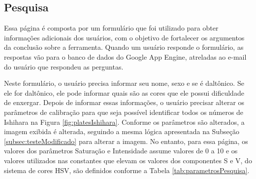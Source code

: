 \documentclass[	12pt, Times, openright, twoside, a4paper, english, brazil]{abntex2}
\begin{document}
\subsection{Pesquisa}
\label{subsec:pesquisa}

Essa página é composta por um formulário que foi utilizado para obter informações adicionais dos usuários, com o objetivo de fortalecer os argumentos da conclusão sobre a ferramenta. Quando um usuário responde o formulário, as respostas vão para o banco de dados do Google App Engine, atreladas ao e-mail do usuário que respondeu as perguntas.


Neste formulário, o usuário precisa informar seu nome, sexo e se é daltônico. Se ele for daltônico, ele pode informar quais são as cores que ele possui dificuldade de enxergar. Depois de informar essas informações, o usuário precisar alterar os parâmetros de calibração para que seja possível identificar todos os números de Ishihara na Figura \ref{fig:platesIshihara}. Conforme os parâmetros são alterados, a imagem exibida é alterada, seguindo a mesma lógica apresentada na Subseção \ref{subsec:testeModificado} para alterar a imagem. No entanto, para essa página, os valores dos parâmetros Saturação e Intensidade assume valores de 0 a 10 e os valores utilizados nas constantes que elevam os valores dos componentes S e V, do sistema de cores HSV, são definidos conforme a Tabela \ref{tab:parametrosPesquisa}. 
\end{document}
